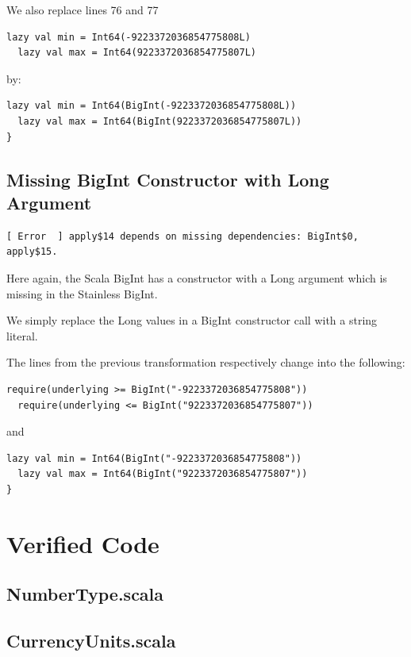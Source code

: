 \documentclass[runningheads]{llncs}
\begin{document}
We also replace lines 76 and 77
\begin{lstlisting}[style=scala]
  lazy val min = Int64(-9223372036854775808L)
  lazy val max = Int64(9223372036854775807L)
\end{lstlisting}

by:
\begin{lstlisting}[style=scala]
  lazy val min = Int64(BigInt(-9223372036854775808L))
  lazy val max = Int64(BigInt(9223372036854775807L))
}
\end{lstlisting}


\subsection{Missing BigInt Constructor with Long Argument}

\begin{lstlisting}[style=stainless]
[ Error  ] apply$14 depends on missing dependencies: BigInt$0, apply$15.
\end{lstlisting}

Here again, the Scala BigInt has a constructor with a Long argument
which is missing in the Stainless BigInt.

We simply replace the Long values in a BigInt constructor call with a string
literal.

The lines from the previous transformation respectively change into
the following:

\begin{lstlisting}[style=scala]
  require(underlying >= BigInt("-9223372036854775808"))
  require(underlying <= BigInt("9223372036854775807"))
\end{lstlisting}

and

\begin{lstlisting}[style=scala]
  lazy val min = Int64(BigInt("-9223372036854775808"))
  lazy val max = Int64(BigInt("9223372036854775807"))
}
\end{lstlisting}


\section{Verified Code}
\label{sec:verified}

\subsection{NumberType.scala}


\subsection{CurrencyUnits.scala}

\end{document}

